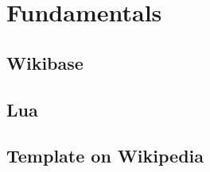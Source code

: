 \section{Fundamentals}
	
	
	
	\subsection{Wikibase} 
	\subsection{Lua}
	\subsection{Template on Wikipedia}
